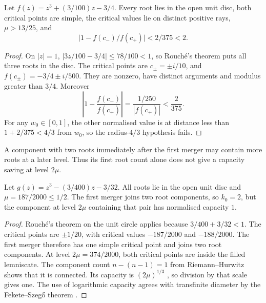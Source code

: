\begin{proposition}
\label{res:sep-or-false}
Let $f(z)=z^3+(3/100)z-3/4$.  Every root lies in the open unit disc, both
critical points are simple, the critical values lie on distinct positive
rays, $\mu>13/25$, and
\[
 \bigl|1-f(c_-)/f(c_+)\bigr|<2/375<2.
\]
\end{proposition}
\begin{proof}
On $|z|=1$, $|3z/100-3/4|\le78/100<1$, so Rouch\'e's theorem puts
all three roots in the disc. The critical points are $c_\pm=\pm i/10$,
and $f(c_\pm)=-3/4\pm i/500$. They are nonzero, have distinct arguments
and modulus greater than $3/4$. Moreover
\[
 \left|1-\frac{f(c_-)}{f(c_+)}\right|
 =\frac{1/250}{|f(c_+)|}<\frac2{375}.
\]
For any $w_0\in[0,1]$, the other normalised value is at distance less
than $1+2/375<4/3$ from $w_0$, so the radius-$4/3$ hypothesis fails.
\end{proof}

A component with two roots immediately after the first merger may
contain more roots at a later level. Thus its first root count alone
does not give a capacity saving at level $2\mu$.

\begin{proposition}
\label{res:arity-not-capacity}
Let $g(z)=z^3-(3/400)z-3/32$. All roots lie in the open unit disc and
$\mu=187/2000\le1/2$. The first merger joins two root components, so
$k_0=2$, but the component at level $2\mu$ containing that pair has
normalised capacity $1$.
\end{proposition}
\begin{proof}
Rouch\'e's theorem on the unit circle applies because
$3/400+3/32<1$. The critical points are $\pm1/20$, with critical values
$-187/2000$ and $-188/2000$. The first merger therefore has one simple
critical point and joins two root components. At level
$2\mu=374/2000$, both critical points are inside the filled lemniscate.
The component count $n-(n-1)=1$ from Riemann--Hurwitz shows that it is
connected. Its capacity is $(2\mu)^{1/3}$
\cite[Theorem~5.2.5]{ransford1995}, so division by that scale gives one.
The use of logarithmic capacity agrees with transfinite diameter by the
Fekete--Szeg\H{o} theorem \cite[p.~153]{ransford1995}.
\end{proof}

